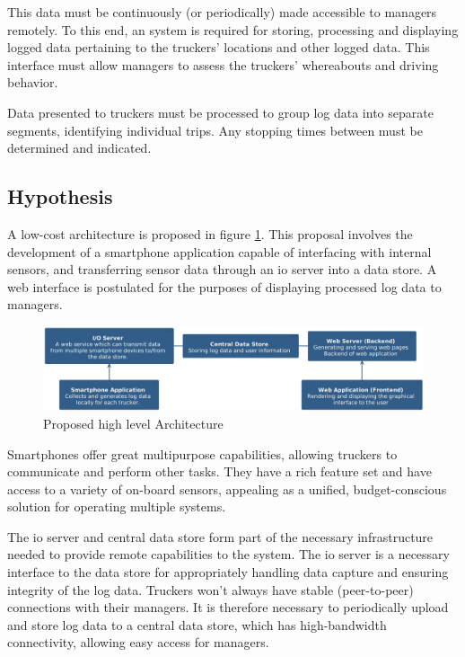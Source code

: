 This data must be continuously (or periodically) made accessible to managers remotely.
To this end, an system is required for storing, processing and displaying logged data pertaining to the truckers' locations and other logged data.
This interface must allow managers to assess the truckers' whereabouts and driving behavior.

Data presented to truckers must be processed to group log data into separate segments, identifying individual trips.
Any stopping times between must be determined and indicated.

\pagebreak
\subsection{Hypothesis}
A low-cost architecture is proposed in figure \ref{fig:hypothesis}.
This proposal involves the development of a smartphone application capable of interfacing with internal sensors, and transferring sensor data through an \ac{io} server into a data store.
A web interface is postulated for the purposes of displaying processed log data to managers.\cite{bertocco1998client}

\begin{figure}[H]
    \centering
    \includegraphics[width=6in]{../diag/hypothesis.png}
    \caption{Proposed high level Architecture}
    \label{fig:hypothesis}
\end{figure}

Smartphones offer great multipurpose capabilities, allowing truckers to communicate and perform other tasks.
They have a rich feature set and have access to a variety of on-board sensors, appealing as a unified, budget-conscious solution for operating multiple systems.

The \ac{io} server and central data store form part of the necessary infrastructure needed to provide remote capabilities to the system.
The \ac{io} server is a necessary interface to the data store for appropriately handling data capture and ensuring integrity of the log data.
Truckers won't always have stable (peer-to-peer) connections with their managers.
It is therefore necessary to periodically upload and store log data to a central data store, which has high-bandwidth connectivity, allowing easy access for managers.

